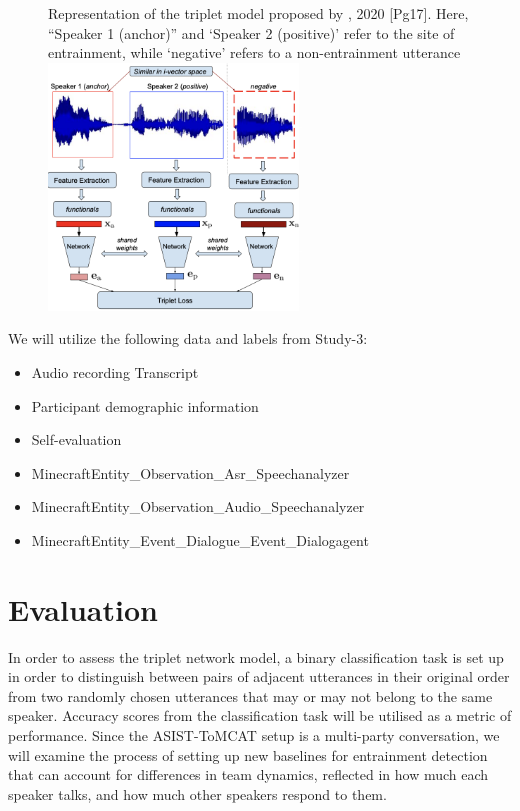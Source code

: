    \begin{figure}
    \begin{sidecaption}{Representation of the triplet model proposed by \citeauthor{nasir2020}, 2020 [Pg17]. Here, ``Speaker 1 (anchor)'' and `Speaker 2 (positive)' refer to the site of entrainment, while `negative' refers to a non-entrainment utterance}
    \centering
    \includegraphics[width=0.6\textwidth]{images/triplet-model.png}
    \label{fig:sentiment_model_schematics}
    \end{sidecaption}
    \end{figure}

    We will utilize the following data and labels from Study-3:
            \begin{itemize}               
                   \item Audio recording
                    Transcript
                   \item Participant demographic information
                   \item Self-evaluation
                   \item MinecraftEntity\_Observation\_Asr\_Speechanalyzer
                   \item MinecraftEntity\_Observation\_Audio\_Speechanalyzer
                   \item MinecraftEntity\_Event\_Dialogue\_Event\_Dialogagent
            \end{itemize}

\section{Evaluation}

    In order to assess the triplet network model, a binary classification task is set up in order to distinguish between pairs of adjacent utterances in their original order from two randomly chosen utterances that may or may not belong to the same speaker. Accuracy scores from the classification task will be utilised as a metric of performance. Since the ASIST-ToMCAT setup is a multi-party conversation, we will examine the process of setting up new baselines for entrainment detection that can account for differences in team dynamics, reflected in how much each speaker talks, and how much other speakers respond to them.  

